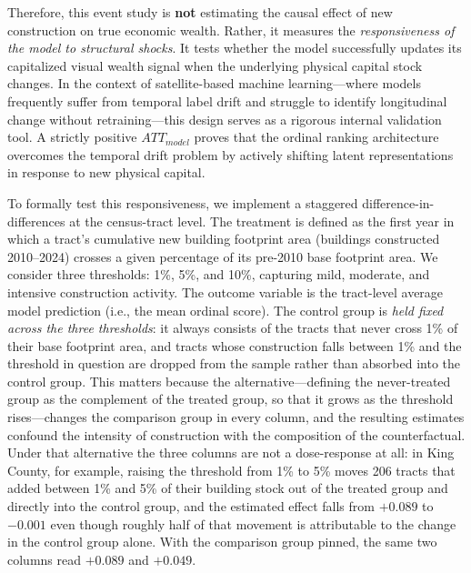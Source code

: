 \documentclass[conference]{IEEEtran}
\begin{document}
Therefore, this event study is \textbf{not} estimating the causal effect of new construction on true economic wealth. Rather, it measures the \textit{responsiveness of the model to structural shocks}. It tests whether the model successfully updates its capitalized visual wealth signal when the underlying physical capital stock changes. In the context of satellite-based machine learning---where models frequently suffer from temporal label drift and struggle to identify longitudinal change without retraining---this design serves as a rigorous internal validation tool. A strictly positive $ATT_{model}$ proves that the ordinal ranking architecture overcomes the temporal drift problem by actively shifting latent representations in response to new physical capital.

To formally test this responsiveness, we implement a staggered difference-in-differences at the census-tract level. The treatment is defined as the first year in which a tract's cumulative new building footprint area (buildings constructed 2010--2024) crosses a given percentage of its pre-2010 base footprint area. We consider three thresholds: 1\%, 5\%, and 10\%, capturing mild, moderate, and intensive construction activity. The outcome variable is the tract-level average model prediction (i.e., the mean ordinal score). The control group is \emph{held fixed across the three thresholds}: it always consists of the tracts that never cross 1\% of their base footprint area, and tracts whose construction falls between 1\% and the threshold in question are dropped from the sample rather than absorbed into the control group. This matters because the alternative---defining the never-treated group as the complement of the treated group, so that it grows as the threshold rises---changes the comparison group in every column, and the resulting estimates confound the intensity of construction with the composition of the counterfactual. Under that alternative the three columns are not a dose-response at all: in King County, for example, raising the threshold from 1\% to 5\% moves 206 tracts that added between 1\% and 5\% of their building stock out of the treated group and directly into the control group, and the estimated effect falls from $+0.089$ to $-0.001$ even though roughly half of that movement is attributable to the change in the control group alone. With the comparison group pinned, the same two columns read $+0.089$ and $+0.049$.
\end{document}
